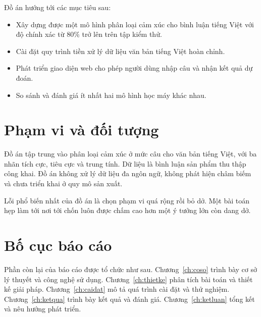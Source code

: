 \begin{mau}
Đồ án hướng tới các mục tiêu sau:
\begin{itemize}[leftmargin=1.6em, itemsep=2pt]
  \item Xây dựng được một mô hình phân loại cảm xúc cho bình luận tiếng Việt
        với độ chính xác từ 80\% trở lên trên tập kiểm thử.
  \item Cài đặt quy trình tiền xử lý dữ liệu văn bản tiếng Việt hoàn chỉnh.
  \item Phát triển giao diện web cho phép người dùng nhập câu và nhận kết
        quả dự đoán.
  \item So sánh và đánh giá ít nhất hai mô hình học máy khác nhau.
\end{itemize}
\end{mau}

\section{Phạm vi và đối tượng}

\begin{chuy}
\end{chuy}

\begin{mau}
Đồ án tập trung vào phân loại cảm xúc ở mức câu cho văn bản tiếng Việt, với
ba nhãn tích cực, tiêu cực và trung tính. Dữ liệu là bình luận sản phẩm thu
thập công khai. Đồ án không xử lý dữ liệu đa ngôn ngữ, không phát hiện châm
biếm và chưa triển khai ở quy mô sản xuất.
\end{mau}

\begin{luuy}
Lỗi phổ biến nhất của đồ án là chọn phạm vi quá rộng rồi bỏ dở. Một bài toán
hẹp làm tới nơi tới chốn luôn được chấm cao hơn một ý tưởng lớn còn dang dở.
\end{luuy}

\section{Bố cục báo cáo}

\begin{chuy}
\end{chuy}

Phần còn lại của báo cáo được tổ chức như sau. Chương~\ref{ch:coso} trình
bày cơ sở lý thuyết và công nghệ sử dụng. Chương~\ref{ch:thietke} phân tích
bài toán và thiết kế giải pháp. Chương~\ref{ch:caidat} mô tả quá trình cài
đặt và thử nghiệm. Chương~\ref{ch:ketqua} trình bày kết quả và đánh giá.
Chương~\ref{ch:ketluan} tổng kết và nêu hướng phát triển.
